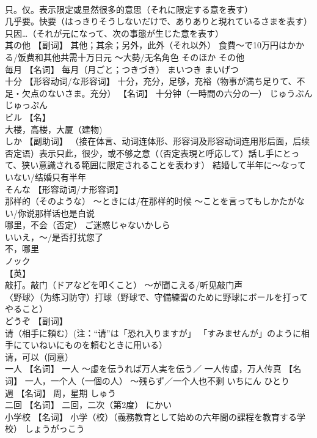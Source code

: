 \documentclass[8pt]{extreport}
\begin{document}
\begin{CJK}{UTF8}{min}
\\	只。仅。表示限定或显然很多的意思（それに限定する意を表す） 
\\	几乎要。快要（はっきりそうしないだけで、ありありと現れているさまを表す） 
\\	只因…（それが元になって、次の事態が生じた意を表す）		
\\	其の他	【副词】 其他；其余；另外，此外（それ以外） 食費～で10万円はかかる/饭费和其他共需十万日元 ～大勢/无名角色	そのほか	その他
\\	毎月	【名词】 每月（月ごと；つきづき）	まいつき まいげつ	
\\	十分	【形容动词/な形容词】 十分，充分，足够，充裕（物事が満ち足りて、不足・欠点のないさま。充分） 【名词】 十分钟（一時間の六分の一）	じゅうぶん じゅっぷん	
\\	ビル	【名】 
\\	大楼，高楼，大厦（建物)		
\\	しか	【副助词】 （接在体言、动词连体形、形容词及形容动词连用形后面，后续否定语）表示只此，很少，或不够之意（（否定表現と呼応して）話し手にとって、狭い意識される範囲に限定されることを表わす） 結婚して半年に〜なっていない/结婚只有半年		
\\	そんな	【形容动词/ナ形容词】 
\\	那样的（そのような） ～ときには/在那样的时候 ～ことを言ってもしかたがない/你说那样话也是白说 
\\	哪里，不会（否定） ご迷惑じゃないかしら
\\	いいえ，～/是否打扰您了
\\	不，哪里		
\\	ノック	
\\	【英】
\\	敲打。敲门（ドアなどを叩くこと） 〜が聞こえる/听见敲门声 
\\	〈野球〉（为练习防守）打球（野球で、守備練習のために野球にボールを打ってやること）		
\\	どうぞ	【副词】 
\\	请（相手に頼む）(注：“请”は「恐れ入りますが」 「すみませんが」のように相手にていねいにものを頼むときに用いる） 
\\	请，可以（同意）		
\\	一人	【名词】 一人 〜虚を伝うれば万人実を伝う／ 一人传虚，万人传真 【名词】 一人，一个人（一個の人） 〜残らず／一个人也不剩	いちにん ひとり	
\\	週	【名词】 周，星期	しゅう	
\\	二回	【名词】 二回，二次（第2度）	にかい	
\\	小学校	【名词】 小学（校）（義務教育として始めの六年間の課程を教育する学校）	しょうがっこう	

\end{CJK}
\end{document}
